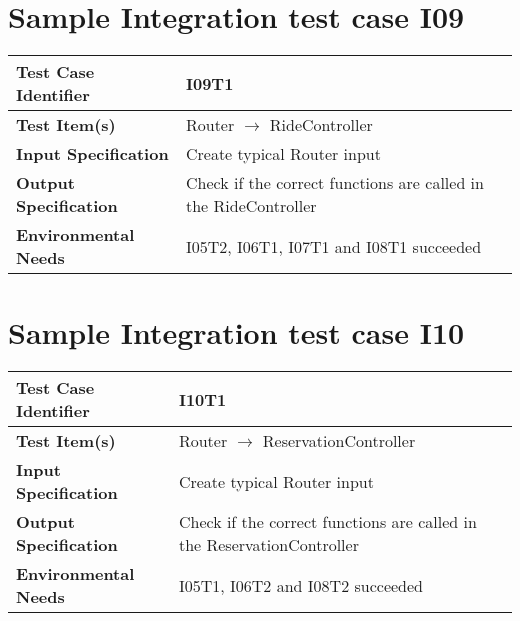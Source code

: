 \section{Sample Integration test case I09}\label{I09}
\begin{center}
	\vspace{0.6cm}
	\begin{tabular}{|l|l|}
		\hline
		\textbf{Test Case Identifier} & I09T1 \bigstrut \\\hline
		\textbf{Test Item(s)} & Router \ensuremath{\rightarrow} RideController \bigstrut \\\hline
		\textbf{Input Specification} & Create typical Router input \bigstrut \\\hline
		\textbf{Output Specification} & Check if the correct functions are called in the RideController \bigstrut \\\hline
		\textbf{Environmental Needs} & I05T2, I06T1, I07T1 and I08T1 succeeded \bigstrut \\\hline
	\end{tabular}
\end{center}

\section{Sample Integration test case I10}\label{I10}
\begin{center}
	\vspace{0.6cm}
	\begin{tabular}{|l|l|}
		\hline
		\textbf{Test Case Identifier} & I10T1 \bigstrut \\\hline
		\textbf{Test Item(s)} & Router \ensuremath{\rightarrow} ReservationController \bigstrut \\\hline
		\textbf{Input Specification} & Create typical Router input \bigstrut \\\hline
		\textbf{Output Specification} & Check if the correct functions are called in the ReservationController \bigstrut \\\hline
		\textbf{Environmental Needs} & I05T1, I06T2 and I08T2 succeeded \bigstrut \\\hline
	\end{tabular}
\end{center}



